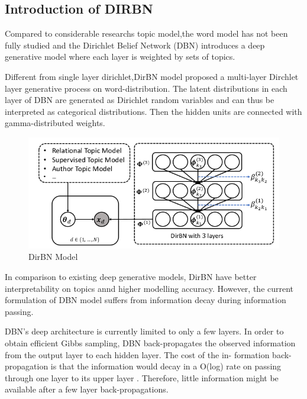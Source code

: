 \subsection{Introduction of DIRBN}
Compared to considerable researchs  topic model,the word model has not been fully studied and the Dirichlet Belief Network (DBN)\cite{Zhao} introduces a deep generative model where each layer is weighted by sets of  topics.

Different from single layer dirichlet,DirBN model proposed a multi-layer Dirchlet layer generative process on word-distribution. The latent distributions in each layer of DBN are generated as Dirichlet
random variables and can thus be interpreted as categorical
distributions. Then  the hidden units are connected with gamma-distributed weights.

\begin{figure}[htbp]
\includegraphics[width = 13cm]{dirbn.png}
\caption{DirBN Model}
\label{fig:DirBN Model}
\end{figure}

In comparison to existing deep generative models, DirBN have better interpretability on topics annd higher modelling accuracy. However, the current formulation of DBN model suffers from information decay during information passing.

DBN’s deep architecture is currently limited to
only a few layers. In order to obtain efficient Gibbs sampling, DBN back-propagates the observed information from
the output layer to each hidden layer. The cost of the in-
formation back-propagation is that the information would
decay in a O(log) rate on passing through one layer to its
upper layer \cite{Zhou}. Therefore, little information might be available after a few layer back-propagations.
